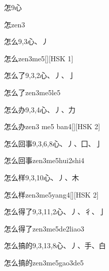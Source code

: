 \begin{entry}{怎}{9}{⼼}
  \begin{phonetics}{怎}{zen3}
  \end{phonetics}
\end{entry}

\begin{entry}{怎么}{9,3}{⼼、⼃}
  \begin{phonetics}{怎么}{zen3me5}[][HSK 1]
  \end{phonetics}
\end{entry}

\begin{entry}{怎么了}{9,3,2}{⼼、⼃、⼅}
  \begin{phonetics}{怎么了}{zen3me5le5}
  \end{phonetics}
\end{entry}

\begin{entry}{怎么办}{9,3,4}{⼼、⼃、⼒}
  \begin{phonetics}{怎么办}{zen3 me5 ban4}[][HSK 2]
  \end{phonetics}
\end{entry}

\begin{entry}{怎么回事}{9,3,6,8}{⼼、⼃、⼞、⼅}
  \begin{phonetics}{怎么回事}{zen3me5hui2shi4}
  \end{phonetics}
\end{entry}

\begin{entry}{怎么样}{9,3,10}{⼼、⼃、⽊}
  \begin{phonetics}{怎么样}{zen3me5yang4}[][HSK 2]
  \end{phonetics}
\end{entry}

\begin{entry}{怎么得了}{9,3,11,2}{⼼、⼃、⼻、⼅}
  \begin{phonetics}{怎么得了}{zen3me5de2liao3}
  \end{phonetics}
\end{entry}

\begin{entry}{怎么搞的}{9,3,13,8}{⼼、⼃、⼿、⽩}
  \begin{phonetics}{怎么搞的}{zen3me5gao3de5}
  \end{phonetics}
\end{entry}

